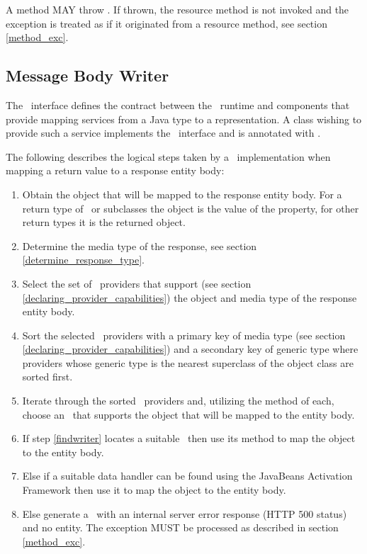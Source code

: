 A \MsgRead{} method MAY throw \WebAppExc. If thrown, the resource method is not invoked and the exception is treated as if it originated from a resource method, see section \ref{method_exc}.

\subsection{Message Body Writer}
\label{message_body_writer}

The \MsgWrite\ interface defines the contract between the \jaxrs\ runtime and components that provide mapping services from a Java type to a representation. A class wishing to provide such a service implements the \MsgWrite\ interface and is annotated with \Provider.

The following describes the logical steps taken by a \jaxrs\ implementation when mapping a return value to a response entity body:

\begin{enumerate}
\item Obtain the object that will be mapped to the response entity body. For a return type of \Response\ or subclasses the object is the value of the  property, for other return types it is the returned object.
\item Determine the media type of the response, see section \ref{determine_response_type}.
\item Select the set of \MsgWrite\ providers that support (see section \ref{declaring_provider_capabilities}) the object and media type of the response entity body.
\item Sort the selected \MsgWrite\ providers with a primary key of media type (see section \ref{declaring_provider_capabilities}) and a secondary key of generic type where providers whose generic type is the nearest superclass of the object class are sorted first.
\item\label{findwriter} Iterate through the sorted \MsgWrite\ providers and, utilizing the  method of each, choose an \MsgWrite\ that supports the object that will be mapped to the entity body.
\item If step \ref{findwriter} locates a suitable \MsgWrite\ then use its  method to map the object to the entity body.
\item Else if a suitable data handler can be found using the JavaBeans Activation Framework\cite{jaf} then use it to map the object to the entity body.
\item Else generate a \WebAppExc\ with an internal server error response (HTTP 500 status) and no entity. The exception MUST be processed as described in section \ref{method_exc}.
\end{enumerate}

